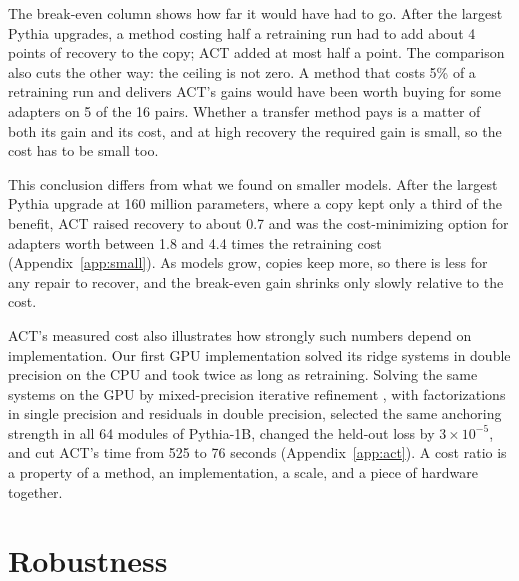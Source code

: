 \documentclass[ijds,nonblindrev]{informs4}
\begin{document}
The break-even column shows how far it would have had to go. After the largest Pythia upgrades, a method costing half a retraining run had to add about 4 points of recovery to the copy; ACT added at most half a point. The comparison also cuts the other way: the ceiling is not zero. A method that costs 5\% of a retraining run and delivers ACT's gains would have been worth buying for some adapters on 5 of the 16 pairs. Whether a transfer method pays is a matter of both its gain and its cost, and at high recovery the required gain is small, so the cost has to be small too.

This conclusion differs from what we found on smaller models. After the largest Pythia upgrade at 160 million parameters, where a copy kept only a third of the benefit, ACT raised recovery to about 0.7 and was the cost-minimizing option for adapters worth between 1.8 and 4.4 times the retraining cost (Appendix~\ref{app:small}). As models grow, copies keep more, so there is less for any repair to recover, and the break-even gain shrinks only slowly relative to the cost.

ACT's measured cost also illustrates how strongly such numbers depend on implementation. Our first GPU implementation solved its ridge systems in double precision on the CPU and took twice as long as retraining. Solving the same systems on the GPU by mixed-precision iterative refinement \citep{higham2002accuracy}, with factorizations in single precision and residuals in double precision, selected the same anchoring strength in all 64 modules of Pythia-1B, changed the held-out loss by $3\times10^{-5}$, and cut ACT's time from 525 to 76 seconds (Appendix~\ref{app:act}). A cost ratio is a property of a method, an implementation, a scale, and a piece of hardware together.

\section{Robustness}\label{sec:robust}
\end{document}
